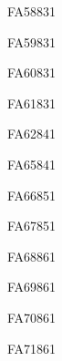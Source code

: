 \documentclass[a4paper,11pt]{report}
\begin{document}
\begin{exol}{FA58}{83}{1} %
\end{exol}

\begin{exol}{FA59}{83}{1} %
\end{exol}

\begin{exol}{FA60}{83}{1} %
\end{exol}

\begin{exol}{FA61}{83}{1} %
\end{exol}

\begin{exol}{FA62}{84}{1} %
\end{exol}


\begin{exol}{FA65}{84}{1} %
\end{exol}

\begin{exol}{FA66}{85}{1} %
\end{exol}

\begin{exol}{FA67}{85}{1} %
\end{exol}

\begin{exol}{FA68}{86}{1} %
\end{exol}

\begin{exol}{FA69}{86}{1} %
\end{exol}

\begin{exol}{FA70}{86}{1} %
\end{exol}

\begin{exol}{FA71}{86}{1} %
\end{exol}
\end{document}
